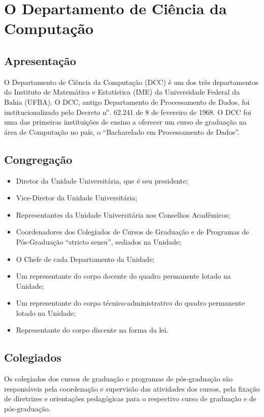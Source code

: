 \chapter{O Departamento de Ciência da Computação}
\DoPToC

\section{Apresentação}

O Departamento de Ciência da Computação (DCC) é um dos três departamentos do Instituto de Matemática e Estatística (IME) da Universidade Federal da Bahia (UFBA). O DCC, antigo Departamento de Processamento de Dados, foi institucionalizado pelo Decreto n$^{\mbox{o}}$. 62.241 de 8 de fevereiro de 1968. O DCC foi uma das primeiras instituições de ensino a oferecer um curso de graduação na área de Computação no país, o ``Bacharelado em Processamento de Dados''.

\section{Congregação}
\begin{itemize}
    \item Diretor da Unidade Universitária, que é seu presidente;
    \item Vice-Diretor da Unidade Universitária;
    \item Representantes da Unidade Universitária nos Conselhos Acadêmicos;
    \item Coordenadores dos Colegiados de Cursos de Graduação e de Programas de Pós-Graduação “stricto sensu”, sediados na Unidade;
    \item O Chefe de cada Departamento da Unidade;
    \item Um representante do corpo docente do quadro permanente lotado na Unidade;
    \item Um representante do corpo técnico-administrativo do quadro permanente lotado na Unidade;
    \item Representante do corpo discente na forma da lei.
\end{itemize}

\section{Colegiados}

Os colegiados dos cursos de graduação e programas de pós-graduação são responsáveis pela coordenação e supervisão das atividades dos cursos, pela fixação de diretrizes e orientações pedagógicas para o respectivo curso de graduação e de pós-graduação.

